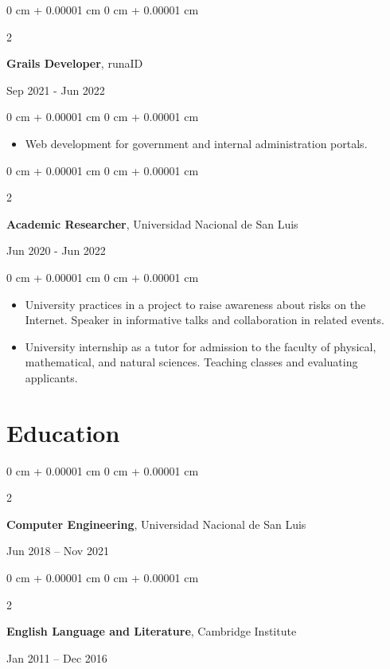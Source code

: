 \documentclass[10pt, letterpaper]{article}
\newenvironment{highlights}{
    \begin{itemize}[
        topsep=0.10 cm,
        parsep=0.10 cm,
        partopsep=0pt,
        itemsep=0pt,
        leftmargin=0 cm + 10pt
    ]
}{
    \end{itemize}
} %
\newenvironment{onecolentry}{
    \begin{adjustwidth}{
        0 cm + 0.00001 cm
    }{
        0 cm + 0.00001 cm
    }
}{
    \end{adjustwidth}
} %
\newenvironment{twocolentry}[2][]{
    \onecolentry
    \def\secondColumn{#2}
    \setcolumnwidth{\fill, 4.5 cm}
    \begin{paracol}{2}
}{
    \switchcolumn \raggedleft \secondColumn
    \end{paracol}
    \endonecolentry
} %
\begin{document}
    \begin{twocolentry}{
            Sep 2021  - Jun 2022
        }
        \textbf{Grails Developer}, runaID
    \end{twocolentry}
    \vspace{0.10 cm}
    \begin{onecolentry}
        \begin{highlights}
            \item Web development for government and internal administration portals.
        \end{highlights}
    \end{onecolentry}
    \vspace{0.2 cm}
    \begin{twocolentry}{
            Jun 2020 - Jun 2022
        }
        \textbf{Academic Researcher}, Universidad Nacional de San Luis
    \end{twocolentry}
    \vspace{0.10 cm}
    \begin{onecolentry}
        \begin{highlights}
            \item University practices in a project to raise awareness about risks on the Internet. Speaker in informative talks and collaboration in related events.
            \item University internship as a tutor for admission to the faculty of physical, mathematical, and natural sciences. Teaching classes and evaluating applicants.
        \end{highlights}
    \end{onecolentry}
    \vspace{0.2 cm}
    \section{Education}                   
    \begin{twocolentry}{
        Jun 2018 – Nov 2021
    }
    \textbf{Computer Engineering}, Universidad Nacional de San Luis
    \end{twocolentry}
    \begin{twocolentry}{
            Jan 2011 – Dec 2016
        }
        \textbf{English Language and Literature}, Cambridge Institute
    \end{twocolentry}
\end{document}
